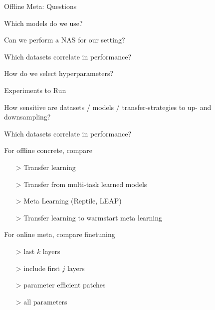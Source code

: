 \documentclass[aspectratio=169,12pt,handout]{beamer}
\begin{document}
\begin{frame}{Offline Meta: Questions}

\begin{itemizebig}
    \item Which models do we use?
    \item Can we perform a NAS for our setting?
    \item Which datasets correlate in performance?
    \item How do we select hyperparameters?
\end{itemizebig}


\end{frame}






\begin{frame}{Experiments to Run}

\begin{itemizebig}
    \item How sensitive are datasets / models / transfer-strategies to up- and downsampling?
    \item Which datasets correlate in performance?


    \item For offline concrete, compare
    \begin{itemize}
        \item[>] Transfer learning
        \item[>] Transfer from multi-task learned models
        \item[>] Meta Learning (Reptile, LEAP)
        \item[>] Transfer learning to warmstart meta learning
    \end{itemize}

    \item For online meta, compare finetuning
    \begin{itemize}
        \item[>] last $k$ layers
        \item[>] include first $j$ layers
        \item[>] parameter efficient patches
        \item[>] all parameters
    \end{itemize}

\end{itemizebig}


\end{frame}
\end{document}
